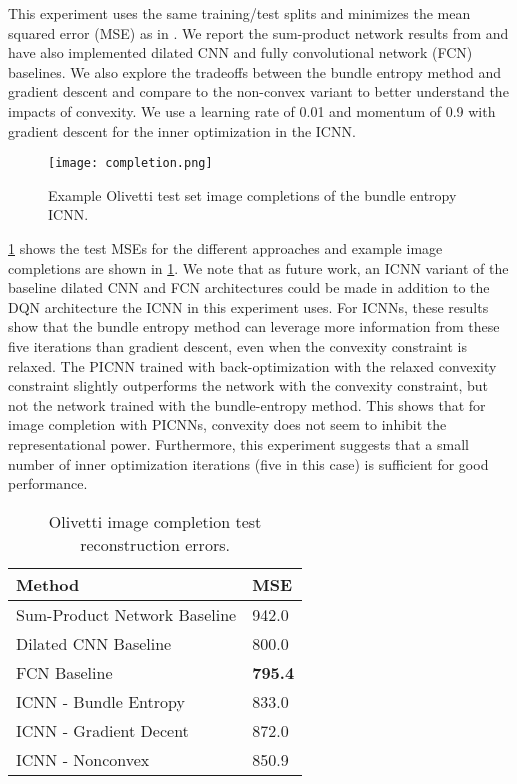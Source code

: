This experiment uses the same training/test splits and minimizes
the mean squared error (MSE) as in
\citet{poon2011sum}.
We report the sum-product network results from \citet{poon2011sum}
and have also implemented dilated CNN
\citep{yu2015multi} and fully convolutional network (FCN)
\citep{long2015fully} baselines.
We also explore the tradeoffs between the bundle entropy method
and gradient descent and compare to the non-convex variant
to better understand the impacts of convexity.
We use a learning rate of 0.01 and momentum of 0.9 with
gradient descent for the inner optimization in the ICNN.

\begin{figure}[t]
  \centering
  \texttt{[image: completion.png]}
  \caption{Example Olivetti test set image completions of the bundle entropy ICNN.}
  \label{fig:images-completed}
\end{figure}

\cref{table:image} shows the test MSEs for the different approaches
and example image completions are shown in \cref{fig:images-completed}.
We note that as future work, an ICNN variant of the baseline dilated
CNN and FCN architectures could be made in addition to
the DQN architecture the ICNN in this experiment uses.
For ICNNs, these results show that the bundle entropy method can
leverage more information from these five iterations than gradient
descent, even when the convexity constraint is relaxed.
The PICNN trained with back-optimization with the relaxed convexity
constraint slightly outperforms the network with
the convexity constraint, but not the network trained with the
bundle-entropy method.
This shows that for image completion with PICNNs, convexity does not
seem to inhibit the representational power.
Furthermore, this experiment suggests that a small number of
inner optimization iterations (five in this case) is
sufficient for good performance.

\begin{table}
\begin{center}
\begin{tabular}{@{}ll@{}}
Method & MSE \\ \hline
Sum-Product Network Baseline \citep{poon2011sum} & 942.0 \\
Dilated CNN Baseline \citep{yu2015multi} & 800.0 \\
FCN Baseline \citep{long2015fully} & \textbf{795.4} \\ \hline
ICNN - Bundle Entropy & 833.0 \\
ICNN - Gradient Decent & 872.0 \\
ICNN - Nonconvex & 850.9 \\
\end{tabular}
\caption{Olivetti image completion test reconstruction errors.}
\label{table:image}
\end{center}
\end{table}

